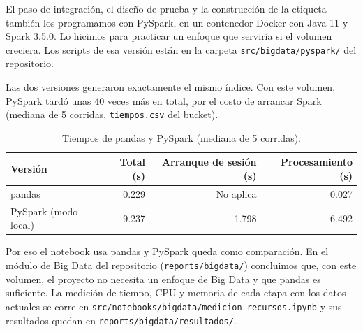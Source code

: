 El paso de integración, el diseño de prueba y la construcción de la etiqueta también los programamos con PySpark, en un contenedor Docker con Java 11 y Spark 3.5.0. Lo hicimos para practicar un enfoque que serviría si el volumen creciera. Los scripts de esa versión están en la carpeta \nolinkurl{src/bigdata/pyspark/} del repositorio.

Las dos versiones generaron exactamente el mismo índice. Con este volumen, PySpark tardó unas 40 veces más en total, por el costo de arrancar Spark (mediana de 5 corridas, \nolinkurl{tiempos.csv} del bucket).

\begin{table}[H]
  \centering
  \caption{Tiempos de pandas y PySpark (mediana de 5 corridas).}
  \label{tab:tiempos}
  \begin{tabular}{lrrr}
    \toprule
    Versión & Total (s) & Arranque de sesión (s) & Procesamiento (s) \\
    \midrule
    pandas & 0.229 & No aplica & 0.027 \\
    PySpark (modo local) & 9.237 & 1.798 & 6.492 \\
    \bottomrule
  \end{tabular}
\end{table}

Por eso el notebook usa pandas y PySpark queda como comparación. En el módulo de Big Data del repositorio (\nolinkurl{reports/bigdata/}) concluimos que, con este volumen, el proyecto no necesita un enfoque de Big Data y que pandas es suficiente. La medición de tiempo, CPU y memoria de cada etapa con los datos actuales se corre en \nolinkurl{src/notebooks/bigdata/medicion_recursos.ipynb} y sus resultados quedan en \nolinkurl{reports/bigdata/resultados/}.
